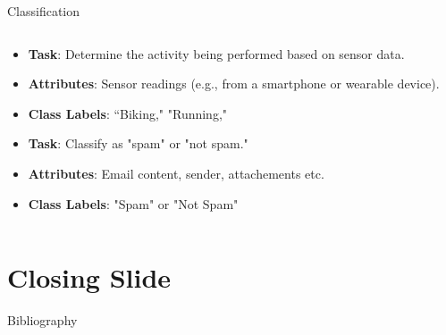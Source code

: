 \documentclass[aspectratio=169]{beamer}
\begin{document}
\begin{frame}{Classification}
\begin{columns}
\begin{column}{0.32\textwidth}
        \begin{coloredblock}
            \begin{itemize}
                \item \scriptsize \textbf{Task}: Determine the activity being performed based on sensor data.
                \item \scriptsize \textbf{Attributes}: Sensor readings (e.g., from a smartphone or wearable device).
                \item \scriptsize \textbf{Class Labels}: “Biking," "Running,"
            \end{itemize}
        \end{coloredblock}
        \vspace{0.1cm}
        \begin{coloredblock}
            \begin{itemize}
                \item \scriptsize \textbf{Task}: Classify as "spam" or "not spam."
                \item \scriptsize \textbf{Attributes}: Email content, sender, attachements etc.
                \item \scriptsize \textbf{Class Labels}: "Spam" or "Not Spam"
            \end{itemize}
        \end{coloredblock}
        
        \end{column}
    \end{columns}

\end{frame}


\section*{Closing Slide}

\begin{frame}
    \label{frame:closing_slide}

\end{frame}


\begin{frame}[allowframebreaks]{Bibliography}
  \printbibliography
\end{frame}
\end{document}
